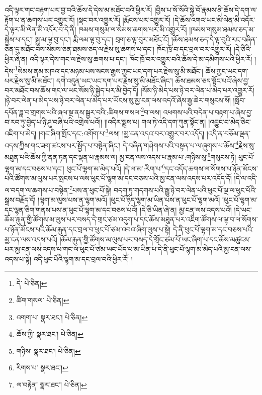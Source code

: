 འདི་ལྟར་གང་བརྟག་པར་བྱ་བའི་ཆོས་དེ་དེས་མ་མཐོང་བའི་ཕྱིར་རོ། །བྱིས་པ་སོ་སོའི་སྐྱེ་བོ་རྣམས་ནི་ཆོས་དེ་དག་ལ་རྟོག་པ་ན་ཆགས་པར་འགྱུར་རོ། །སྡང་བར་འགྱུར་རོ། །རྨོངས་པར་འགྱུར་རོ། །དེ་ཆོས་འགའ་ཡང་མི་ལེན་མི་འདོར་དེ་ལྟར་མི་ལེན་མི་འདོར་བ་དེ་ནི། ཁམས་གསུམ་ལ་སེམས་ཆགས་པར་མི་འགྱུར་རོ། །ཁམས་གསུམ་ཐམས་ཅད་མ་སྐྱེས་པ་དང་། སྒྱུ་མ་ལྟ་བུ་དང་། རྨི་ལམ་ལྟ་བུ་དང་། བྲག་ཅ་ལྟ་བུར་མཐོང་ངོ། །ཆོས་ཐམས་ཅད་དེ་ལྟ་བུའི་རང་བཞིན་ཅན་དུ་མཐོང་བས་སེམས་ཅན་ཐམས་ཅད་ལ་རྗེས་སུ་ཆགས་པ་དང་། ཁོང་ཁྲོ་བ་དང་བྲལ་བར་འགྱུར་རོ། །དེ་ཅིའི་ཕྱིར་ཞེ་ན། འདི་ལྟར་དེས་གང་ལ་རྗེས་སུ་ཆགས་པ་དང་། ཁོང་ཁྲོ་བར་འགྱུར་བའི་ཆོས་དེ་མ་དམིགས་པའི་ཕྱིར་རོ། །དེས་\footnote{དེ་  པེ་ཅིན། }སེམས་ནམ་མཁའ་དང་མཉམ་པས་སངས་རྒྱས་ཀྱང་ཡང་དག་པར་རྗེས་སུ་མི་མཐོང་། ཆོས་ཀྱང་ཡང་དག་པར་རྗེས་སུ་མི་མཐོང་། དགེ་འདུན་ཡང་ཡང་དག་པར་རྗེས་སུ་མི་མཐོང་ཞིང་། ཆོས་ཐམས་ཅད་སྟོང་པའོ་ཞེས་བྱ་བར་མཐོང་བས་ཆོས་གང་ལ་ཡང་སོམ་ཉི་སྐྱེད་པར་མི་བྱེད་དོ། །སོམ་ཉི་མེད་པས་ཉེ་བར་ལེན་པ་མེད་པར་འགྱུར་རོ། །ཉེ་བར་ལེན་པ་མེད་པས་ཉེ་བར་ལེན་པ་མེད་པར་ཡོངས་སུ་མྱ་ངན་ལས་འདའོ་ཞེས་རྒྱ་ཆེར་གསུངས་སོ། །སློབ་དཔོན་ཟླ་བ་གྲགས་པའི་ཞལ་སྔ་ནས་སྦྱར་བའི་:ཚིགས་གསལ་\footnote{ཚིག་གསལ་  པེ་ཅིན། }བ་ལས། འཕགས་པའི་བདེན་པ་བརྟག་པ་ཞེས་བྱ་བ་རབ་ཏུ་བྱེད་པ་ཉི་ཤུ་བཞི་པའི་འགྲེལ་པའོ།། །།འདིར་སྨྲས་པ། གལ་ཏེ་འདི་དག་ཀུན་སྟོང་ན། །འབྱུང་བ་མེད་ཅིང་འཇིག་པ་མེད། །གང་ཞིག་སྤོང་དང་:འགོག་པ་\footnote{འགག་པ་  སྣར་ཐང་།  པེ་ཅིན། }ལས། །མྱ་ངན་འདའ་བར་འགྱུར་བར་འདོད། །འདི་ན་བཅོམ་ལྡན་འདས་ཀྱིས་གང་ཟག་ཚངས་པར་སྤྱོད་པ་བསྟེན་ཞིང་། དེ་བཞིན་གཤེགས་པའི་བསྟན་པ་ལ་ཞུགས་པ་ཆོས་\footnote{ཆོས་ཀྱི་  སྣར་ཐང་།  པེ་ཅིན། }རྗེས་སུ་མཐུན་པའི་ཆོས་ཀྱི་ནན་ཏན་དང་ལྡན་པ་རྣམས་ལ། མྱ་ངན་ལས་འདས་པ་རྣམ་པ་:གཉིས་སུ་\footnote{གཉིས་  སྣར་ཐང་།  པེ་ཅིན། }གསུངས་ཏེ། ཕུང་པོ་ལྷག་མ་དང་བཅས་པ་དང་། ཕུང་པོ་ལྷག་མ་མེད་པའོ། །དེ་ལ་མ་:རིག་པ་\footnote{རིགས་པ་  སྣར་ཐང་། }དང་འདོད་ཆགས་ལ་སོགས་པ་ཉོན་མོངས་པའི་ཚོགས་མ་ལུས་པར་སྤངས་པ་ལས་ཕུང་པོ་ལྷག་མ་དང་བཅས་པའི་མྱ་ངན་ལས་འདས་པར་འདོད་དོ། །དེ་ལ་འདི་ལ་བདག་ལ་ཆགས་པ་བསྟེན་\footnote{ལ་བརྟེན་  སྣར་ཐང་།  པེ་ཅིན། }པས་ན་ཕུང་པོ་སྟེ། བདག་ཏུ་གདགས་པའི་རྒྱུ་ཉེ་བར་ལེན་པའི་ཕུང་པོ་ལྔ་ལ་ཕུང་པོའི་སྒྲས་བརྗོད་དོ། །ལྷག་མ་ལུས་པས་ན་ལྷག་མའོ། །ཕུང་པོ་ཉིད་ལྷག་མ་ཡིན་པས་ན་ཕུང་པོ་ལྷག་མའོ། །ཕུང་པོ་ལྷག་མ་དང་ལྷན་ཅིག་གནས་པས་ན་ཕུང་པོ་ལྷག་མ་དང་བཅས་པའོ། །དེ་ཅི་ཡིན་ཞེ་ན། མྱ་ངན་ལས་འདས་པའོ། །དེ་ཡང་ཆོམ་རྐུན་གྱི་ཚོགས་མ་ལུས་པར་བསད་དེ་གྲང་ཙམ་འདུག་པ་དང་ཆོས་མཐུན་པར་འཇིག་ཚོགས་ལ་ལྟ་བ་ལ་སོགས་པ་ཉོན་མོངས་པའི་ཆོམ་རྐུན་དང་བྲལ་བ་ཕུང་པོ་ཙམ་འབའ་ཞིག་ལུས་པ་སྟེ། དེ་ནི་ཕུང་པོ་ལྷག་མ་དང་བཅས་པའི་མྱ་ངན་ལས་འདས་པའོ། །ཆོམ་རྐུན་གྱི་ཚོགས་མ་ལུས་པར་བསད་དེ་གྲོང་ཙམ་པོ་ཡང་ཞིག་པ་དང་ཆོས་མཚུངས་པར་མྱ་ངན་ལས་འདས་པ་གང་ལ་ཕུང་པོ་ཙམ་ཡང་ཡོད་པ་མ་ཡིན་པ་དེ་ནི་ཕུང་པོ་ལྷག་མ་མེད་པའི་མྱ་ངན་ལས་འདས་པ་སྟེ། འདི་ཕུང་པོའི་ལྷག་མ་དང་བྲལ་བའི་ཕྱིར་རོ། །
